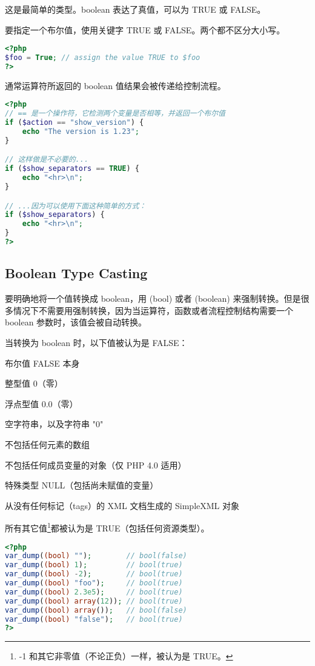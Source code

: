 这是最简单的类型。boolean 表达了真值，可以为 TRUE 或 FALSE。

要指定一个布尔值，使用关键字 TRUE 或 FALSE。两个都不区分大小写。

\begin{lstlisting}[language=PHP]
<?php
$foo = True; // assign the value TRUE to $foo
?>
\end{lstlisting}

通常运算符所返回的 boolean 值结果会被传递给控制流程。

\begin{lstlisting}[language=PHP]
<?php
// == 是一个操作符，它检测两个变量是否相等，并返回一个布尔值
if ($action == "show_version") {
    echo "The version is 1.23";
}

// 这样做是不必要的...
if ($show_separators == TRUE) {
    echo "<hr>\n";
}

// ...因为可以使用下面这种简单的方式：
if ($show_separators) {
    echo "<hr>\n";
}
?>
\end{lstlisting}

\subsection{Boolean Type Casting}


要明确地将一个值转换成 boolean，用 (bool) 或者 (boolean) 来强制转换。但是很多情况下不需要用强制转换，因为当运算符，函数或者流程控制结构需要一个 boolean 参数时，该值会被自动转换。

当转换为 boolean 时，以下值被认为是 FALSE：

\begin{compactitem}
\item 布尔值 FALSE 本身
\item 整型值 0（零）
\item 浮点型值 0.0（零）
\item 空字符串，以及字符串 "0"
\item 不包括任何元素的数组
\item 不包括任何成员变量的对象（仅 PHP 4.0 适用）
\item 特殊类型 NULL（包括尚未赋值的变量）
\item 从没有任何标记（tags）的 XML 文档生成的 SimpleXML 对象
\end{compactitem}

所有其它值\footnote{-1 和其它非零值（不论正负）一样，被认为是 TRUE。}都被认为是 TRUE（包括任何资源类型）。


\begin{lstlisting}[language=PHP]
<?php
var_dump((bool) "");        // bool(false)
var_dump((bool) 1);         // bool(true)
var_dump((bool) -2);        // bool(true)
var_dump((bool) "foo");     // bool(true)
var_dump((bool) 2.3e5);     // bool(true)
var_dump((bool) array(12)); // bool(true)
var_dump((bool) array());   // bool(false)
var_dump((bool) "false");   // bool(true)
?>
\end{lstlisting}


